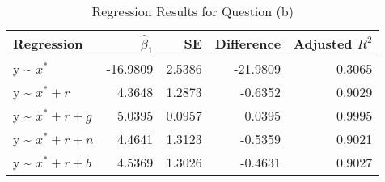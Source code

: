 \begin{table}[htbp!]

\caption{Regression Results for Question (b)}
\centering
\begin{tabular}[t]{lrrrr}
\toprule
Regression & $\hat{\beta}_1$ & SE & Difference & Adjusted $R^2$\\
\midrule
y \textasciitilde{} $x^*$ & -16.9809 & 2.5386 & -21.9809 & 0.3065\\
y \textasciitilde{} $x^* + r$ & 4.3648 & 1.2873 & -0.6352 & 0.9029\\
y \textasciitilde{} $x^* + r + g$ & 5.0395 & 0.0957 & 0.0395 & 0.9995\\
y \textasciitilde{} $x^* + r + n$ & 4.4641 & 1.3123 & -0.5359 & 0.9021\\
y \textasciitilde{} $x^* + r + b$ & 4.5369 & 1.3026 & -0.4631 & 0.9027\\
\bottomrule
\end{tabular}
\end{table}
